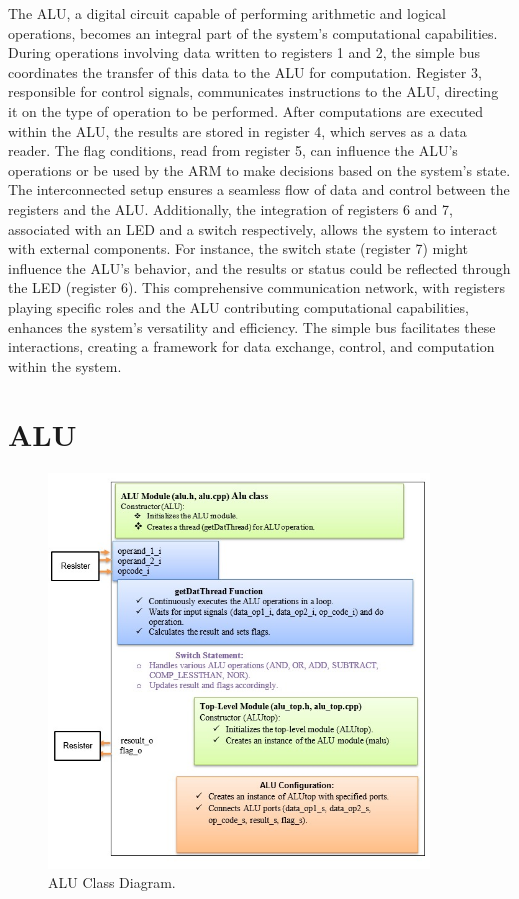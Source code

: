 \documentclass[a4paper,12pt,english]{report}
\begin{document}
The ALU, a digital circuit capable of performing arithmetic and logical operations, becomes an integral part of the system's computational capabilities. During operations involving data written to registers 1 and 2, the simple bus coordinates the transfer of this data to the ALU for computation. Register 3, responsible for control signals, communicates instructions to the ALU, directing it on the type of operation to be performed. After computations are executed within the ALU, the results are stored in register 4, which serves as a data reader. The flag conditions, read from register 5, can influence the ALU's operations or be used by the ARM to make decisions based on the system's state. The interconnected setup ensures a seamless flow of data and control between the registers and the ALU. Additionally, the integration of registers 6 and 7, associated with an LED and a switch respectively, allows the system to interact with external components. For instance, the switch state (register 7) might influence the ALU's behavior, and the results or status could be reflected through the LED (register 6). This comprehensive communication network, with registers playing specific roles and the ALU contributing computational capabilities, enhances the system's versatility and efficiency. The simple bus facilitates these interactions, creating a framework for data exchange, control, and computation within the system.
\newpage
\section{ALU}
 \begin{figure}[h]
	\centering
	\includegraphics[width=0.9\textwidth]{ALU_class_d.jpg} %
	\caption{ALU Class Diagram.}
 \end{figure}
 
\end{document}
